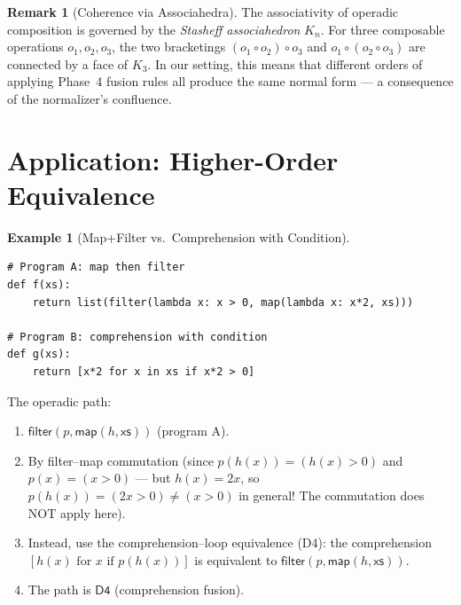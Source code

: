 \documentclass[11pt,a4paper]{report}
\theoremstyle{definition}
\newtheorem{example}[definition]{Example}
\newtheorem{remark}[definition]{Remark}
\theoremstyle{plain}
\begin{document}
\begin{remark}[Coherence via Associahedra]
The associativity of operadic composition is governed by the
\emph{Stasheff associahedron} $K_n$.  For three composable operations
$o_1, o_2, o_3$, the two bracketings $(o_1 \circ o_2) \circ o_3$
and $o_1 \circ (o_2 \circ o_3)$ are connected by a face of $K_3$.
In our setting, this means that different orders of applying
Phase~4 fusion rules all produce the same normal form ---
a consequence of the normalizer's confluence.
\end{remark}

\section{Application: Higher-Order Equivalence}

\begin{example}[Map+Filter vs.\ Comprehension with Condition]
\begin{lstlisting}
# Program A: map then filter
def f(xs):
    return list(filter(lambda x: x > 0, map(lambda x: x*2, xs)))

# Program B: comprehension with condition
def g(xs):
    return [x*2 for x in xs if x*2 > 0]
\end{lstlisting}

The operadic path:
\begin{enumerate}
  \item $\mathsf{filter}(p, \mathsf{map}(h, \mathsf{xs}))$
    (program A).
  \item By filter--map commutation (since $p(h(x)) = (h(x) > 0)$
    and $p(x) = (x > 0)$ --- but $h(x) = 2x$, so
    $p(h(x)) = (2x > 0) \neq (x > 0)$ in general!  The commutation
    does NOT apply here).
  \item Instead, use the comprehension--loop equivalence (D4):
    the comprehension $[h(x) \text{ for } x \text{ if } p(h(x))]$
    is equivalent to $\mathsf{filter}(p, \mathsf{map}(h, \mathsf{xs}))$.
  \item The path is $\mathsf{D4}$ (comprehension fusion).
\end{enumerate}
\end{example}
\end{document}
